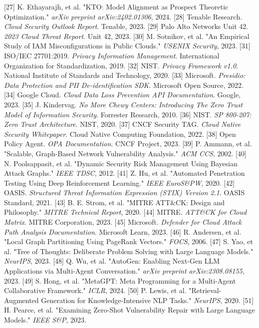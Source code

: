 \documentclass[a4paper,12pt]{ctexart}
\begin{document}
[27] K. Ethayarajh, et al. "KTO: Model Alignment as Prospect Theoretic Optimization." \textit{arXiv preprint arXiv:2402.01306}, 2024.
[28] Tenable Research. \textit{Cloud Security Outlook Report}. Tenable, 2023.
[29] Palo Alto Networks Unit 42. \textit{2023 Cloud Threat Report}. Unit 42, 2023.
[30] M. Sotnikov, et al. "An Empirical Study of IAM Misconfigurations in Public Clouds." \textit{USENIX Security}, 2023.
[31] ISO/IEC 27701:2019. \textit{Privacy Information Management}. International Organization for Standardization, 2019.
[32] NIST. \textit{Privacy Framework v1.0}. National Institute of Standards and Technology, 2020.
[33] Microsoft. \textit{Presidio: Data Protection and PII De-identification SDK}. Microsoft Open Source, 2022.
[34] Google Cloud. \textit{Cloud Data Loss Prevention API Documentation}. Google, 2023.
[35] J. Kindervag. \textit{No More Chewy Centers: Introducing The Zero Trust Model of Information Security}. Forrester Research, 2010.
[36] NIST. \textit{SP 800-207: Zero Trust Architecture}. NIST, 2020.
[37] CNCF Security TAG. \textit{Cloud Native Security Whitepaper}. Cloud Native Computing Foundation, 2022.
[38] Open Policy Agent. \textit{OPA Documentation}. CNCF Project, 2023.
[39] P. Ammann, et al. "Scalable, Graph-Based Network Vulnerability Analysis." \textit{ACM CCS}, 2002.
[40] N. Poolsappasit, et al. "Dynamic Security Risk Management Using Bayesian Attack Graphs." \textit{IEEE TDSC}, 2012.
[41] Z. Hu, et al. "Automated Penetration Testing Using Deep Reinforcement Learning." \textit{IEEE EuroS\&PW}, 2020.
[42] OASIS. \textit{Structured Threat Information Expression (STIX) Version 2.1}. OASIS Standard, 2021.
[43] B. E. Strom, et al. "MITRE ATT\&CK: Design and Philosophy." \textit{MITRE Technical Report}, 2020.
[44] MITRE. \textit{ATT\&CK for Cloud Matrix}. MITRE Corporation, 2023.
[45] Microsoft. \textit{Defender for Cloud Attack Path Analysis Documentation}. Microsoft Learn, 2023.
[46] R. Andersen, et al. "Local Graph Partitioning Using PageRank Vectors." \textit{FOCS}, 2006.
[47] S. Yao, et al. "Tree of Thoughts: Deliberate Problem Solving with Large Language Models." \textit{NeurIPS}, 2023.
[48] Q. Wu, et al. "AutoGen: Enabling Next-Gen LLM Applications via Multi-Agent Conversation." \textit{arXiv preprint arXiv:2308.08155}, 2023.
[49] S. Hong, et al. "MetaGPT: Meta Programming for a Multi-Agent Collaborative Framework." \textit{ICLR}, 2024.
[50] P. Lewis, et al. "Retrieval-Augmented Generation for Knowledge-Intensive NLP Tasks." \textit{NeurIPS}, 2020.
[51] H. Pearce, et al. "Examining Zero-Shot Vulnerability Repair with Large Language Models." \textit{IEEE S\&P}, 2023.
\end{document}
